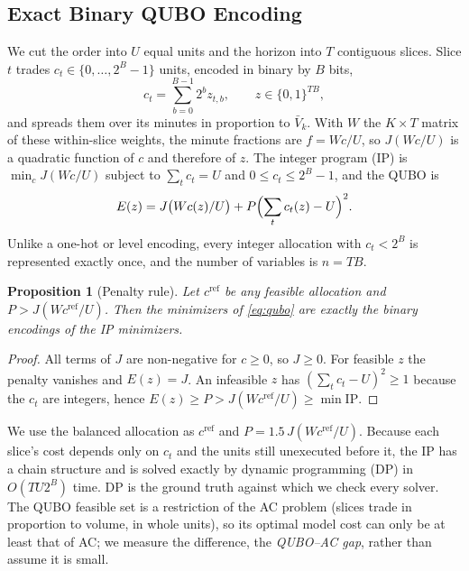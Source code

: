 \documentclass[journal]{IEEEtran}
\newtheorem{proposition}{Proposition}
\begin{document}
\subsection{Exact Binary QUBO Encoding}
\label{sec:qubo}

We cut the order into $U$ equal units and the horizon into $T$ contiguous slices. Slice $t$
trades $c_t\in\{0,\dots,2^B-1\}$ units, encoded in binary by $B$ bits,
\begin{equation}
c_t=\sum_{b=0}^{B-1} 2^b z_{t,b},\qquad z\in\{0,1\}^{TB},
\end{equation}
and spreads them over its minutes in proportion to $\bar V_k$. With $W$ the $K\times T$ matrix
of these within-slice weights, the minute fractions are $f=Wc/U$, so $J(Wc/U)$ is a quadratic
function of $c$ and therefore of $z$. The integer program (IP) is
$\min_c J(Wc/U)$ subject to $\sum_t c_t=U$ and $0\le c_t\le 2^B-1$, and the QUBO is
\begin{equation}
E(z) = J\bigl(W c(z)/U\bigr) + P\Bigl(\sum_{t} c_t(z) - U\Bigr)^2 .
\label{eq:qubo}
\end{equation}
Unlike a one-hot or level encoding, every integer allocation with $c_t<2^B$ is represented
exactly once, and the number of variables is $n=TB$.

\begin{proposition}[Penalty rule]
Let $c^{\mathrm{ref}}$ be any feasible allocation and $P>J(Wc^{\mathrm{ref}}/U)$. Then the
minimizers of \eqref{eq:qubo} are exactly the binary encodings of the IP minimizers.
\end{proposition}
\begin{proof}
All terms of $J$ are non-negative for $c\ge 0$, so $J\ge 0$. For feasible $z$ the penalty
vanishes and $E(z)=J$. An infeasible $z$ has $(\sum_t c_t-U)^2\ge 1$ because the $c_t$ are
integers, hence $E(z)\ge P > J(Wc^{\mathrm{ref}}/U) \ge \min \mathrm{IP}$.
\end{proof}
We use the balanced allocation as $c^{\mathrm{ref}}$ and $P=1.5\,J(Wc^{\mathrm{ref}}/U)$.
Because each slice's cost depends only on $c_t$ and the units still unexecuted before it,
the IP has a chain structure and is solved exactly by dynamic programming (DP) in
$O(TU2^B)$ time. DP is the ground truth against which we check every solver. The QUBO
feasible set is a restriction of the AC problem (slices trade in proportion to volume, in
whole units), so its optimal model cost can only be at least that of AC; we measure the
difference, the \emph{QUBO--AC gap}, rather than assume it is small.
\end{document}
